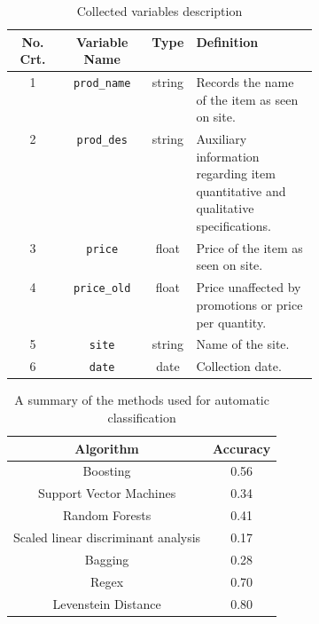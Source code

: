 \documentclass[]{article}
\begin{document}
\begin{table}[h!]
	\centering
	\begin{tabular}{ c c c p{0.4\linewidth}}
		\hline
		No. Crt. & Variable Name & Type & Definition  \\
		\hline  
		1 & \texttt{prod\_name} & string & Records the name of the item as seen on site.\\  \hline
		2 & \texttt{prod\_des}  & string & Auxiliary information regarding item quantitative and qualitative specifications. \\ \hline
		3 & \texttt{price}	  	& float  & Price of the item as seen on site.  \\ \hline
		4 & \texttt{price\_old} & float  & Price unaffected by promotions or price per quantity.\\ \hline
		5 & \texttt{site}	  	& string & Name of the site. \\ \hline
		6 & \texttt{date} 	  	& date   & Collection date. \\ 
		\hline
	\end{tabular}
	\caption{Collected variables description}
	\label{table:1}
\end{table}

\clearpage

\begin{table}[h!]
	\centering
	\begin{tabular}{ c c }
		\hline
		Algorithm & Accuracy \\
		\hline  
		Boosting & 0.56 \\  
		Support Vector Machines & 0.34 \\
		Random Forests &  0.41 \\
		Scaled linear discriminant analysis & 0.17 \\
		Bagging & 0.28 \\
		Regex & 0.70 \\
		Levenstein Distance & 0.80 \\
		\hline
	\end{tabular}
	\caption{A summary of the methods used for automatic classification}
	\label{table:2}
\end{table}


\clearpage
\end{document}
